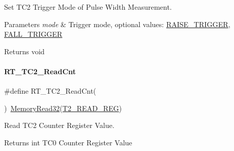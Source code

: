 Set T\+C2 Trigger Mode of Pulse Width Measurement. 


\begin{DoxyParams}{Parameters}
{\em mode} & Trigger mode, optional values\+: \mbox{\hyperlink{a00020_abda90eda34a640b130f48a6ade23fe22}{R\+A\+I\+S\+E\+\_\+\+T\+R\+I\+G\+G\+ER}}, \mbox{\hyperlink{a00020_a9bbaf5b9e2125c7597249c7113b20e6c}{F\+A\+L\+L\+\_\+\+T\+R\+I\+G\+G\+ER}} \\
\hline
\end{DoxyParams}
\begin{DoxyReturn}{Returns}
void 
\end{DoxyReturn}
\mbox{\label{a00047_a6591a513f367f6e7be0a90cb72aa3d49}} 
\paragraph{\texorpdfstring{R\+T\+\_\+\+T\+C2\+\_\+\+Read\+Cnt}{RT\_TC2\_ReadCnt}}
{\footnotesize\ttfamily \#define R\+T\+\_\+\+T\+C2\+\_\+\+Read\+Cnt(\begin{DoxyParamCaption}{ }\end{DoxyParamCaption})~\mbox{\hyperlink{a00020_a2d484dc15bdf30ee11ab3b05f31f0e16}{Memory\+Read32}}(\mbox{\hyperlink{a00020_adadaa0ab1ebbd7ba9b70dfd24c3ed44da2ce860fb68efa5daaac3e07dd534dd54}{T2\+\_\+\+R\+E\+A\+D\+\_\+\+R\+EG}})}



Read T\+C2 Counter Register Value. 

\begin{DoxyReturn}{Returns}
int T\+C0 Counter Register Value 
\end{DoxyReturn}
\mbox{\label{a00047_a49e7120e90142442bdd0744f61b572a5}} 
